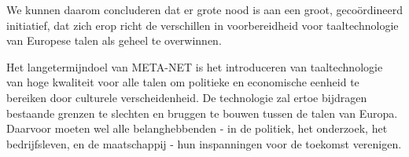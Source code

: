 \documentclass[]{../../metanetpaper}
\begin{document}
\begin{multicols}{2}
    We kunnen daarom concluderen dat er grote nood is aan een groot, geco{\"o}rdineerd initiatief, dat zich erop richt de verschillen in voorbereidheid voor taaltechnologie van Europese talen als geheel te overwinnen.

    Het langetermijndoel van META-NET is het introduceren van taaltechnologie van hoge kwaliteit voor alle talen om politieke en economische eenheid te bereiken door culturele verscheidenheid. De technologie zal ertoe bijdragen bestaande grenzen te slechten en bruggen te bouwen tussen de talen van Europa. Daarvoor moeten wel alle belanghebbenden - in de politiek, het onderzoek, het bedrijfsleven, en de maatschappij - hun inspanningen voor de toekomst verenigen.
\end{multicols}

\clearpage
\end{document}
